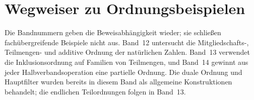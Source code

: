 \documentclass[main.tex]{subfiles}
\begin{document}
\leavevmode\par\medskip

\begin{tabproof}
\end{tabproof}


\chapter{Wegweiser zu Ordnungsbeispielen}

Die Bandnummern geben die Beweisabhängigkeit wieder; sie schließen
fachübergreifende Beispiele nicht aus. Band~12 untersucht die
Mitgliedschafts-, Teilmengen- und additive Ordnung der natürlichen Zahlen.
Band~13 verwendet die Inklusionsordnung auf Familien von Teilmengen, und
Band~14 gewinnt aus jeder Halbverbandsoperation eine partielle Ordnung. Die
duale Ordnung und Hauptfilter wurden bereits in diesem Band als allgemeine
Konstruktionen behandelt; die endlichen Teilordnungen folgen in Band~13.
\end{document}
